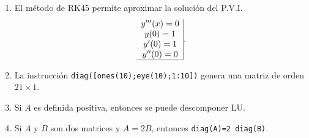 \documentclass[11pt]{article}
\begin{document}
\begin{enumerate}
\begin{enumerate}
\begin{minipage}{0.4\textwidth}
    \end{minipage}
%
\item
{} 
    \begin{minipage}{0.4\textwidth}
	El método de RK45 permite aproximar la soluci\'on del P.V.I. 
    $$
    \begin{array}{c|}
    y'''(x)=0\\
    y(0)=1  \\
    y'(0)=1 \\
    y''(0)=0\\ \hline
    \end{array}.
    $$
    \end{minipage} 
    \begin{minipage}{0.4\textwidth}
    \end{minipage}
%
\item
{} 
    \begin{minipage}{0.4\textwidth}
	La instrucci\'on 
    \texttt{diag([ones(10);eye(10);1:10])}
    genera una matriz de orden $21\times1$.
    \end{minipage} 
    \begin{minipage}{0.4\textwidth}
 	\fbox{5pt}
    \end{minipage}
\item
{} 
    \begin{minipage}{0.4\textwidth}
	Si $A$ es definida positiva, entonces se puede descomponer LU.
    \end{minipage} 
    \begin{minipage}{0.4\textwidth}
    \end{minipage}
%
\item
{} 
    \begin{minipage}{0.4\textwidth}
	Si $A$ y $B$ son dos matrices y $A=2B$, entonces \texttt{diag(A)=2\,diag(B)}.
	\end{minipage} 
    \begin{minipage}{0.4\textwidth}
      

\end{minipage}
\end{enumerate}
\end{enumerate}
\end{document}
